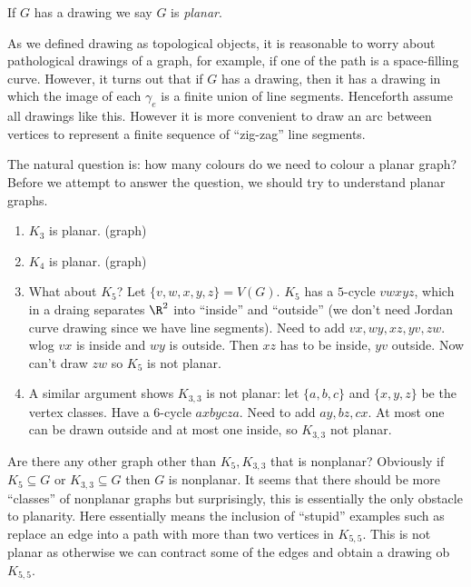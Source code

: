 \documentclass[a4paper]{article}
\begin{document}
\begin{definition}
  If \(G\) has a drawing we say \(G\) is \emph{planar}.
\end{definition}

\begin{remark}
  As we defined drawing as topological objects, it is reasonable to worry about pathological drawings of a graph, for example, if one of the path is a space-filling curve. However, it turns out that if \(G\) has a drawing, then it has a drawing in which the image of each \(\gamma_e\) is a finite union of line segments. Henceforth assume all drawings like this. However it is more convenient to draw an arc between vertices to represent a finite sequence of ``zig-zag'' line segments.
\end{remark}

The natural question is: how many colours do we need to colour a planar graph? Before we attempt to answer the question, we should try to understand planar graphs.

\begin{eg}\leavevmode
  \begin{enumerate}
  \item \(K_3\) is planar. (graph)
  \item \(K_4\) is planar. (graph)
  \item What about \(K_5\)? Let \(\{v, w, x, y, z\} = V(G)\). \(K_5\) has a \(5\)-cycle \(vwxyz\), which in a draing separates \(\R^2\) into ``inside'' and ``outside'' (we don't need Jordan curve drawing since we have line segments). Need to add \(vx, wy, xz, yv, zw\). wlog \(vx\) is inside and \(wy\) is outside. Then \(xz\) has to be inside, \(yv\) outside. Now can't draw \(zw\) so \(K_5\) is not planar.
  \item A similar argument shows \(K_{3, 3}\) is not planar: let \(\{a, b, c\}\) and \(\{x, y, z\}\) be the vertex classes. Have a \(6\)-cycle \(axbycza\). Need to add \(ay, bz, cx\). At most one can be drawn outside and at most one inside, so \(K_{3, 3}\) not planar.
  \end{enumerate}
\end{eg}

Are there any other graph other than \(K_5, K_{3, 3}\) that is nonplanar? Obviously if \(K_5 \subseteq G\) or \(K_{3, 3} \subseteq G\) then \(G\) is nonplanar. It seems that there should be more ``classes'' of nonplanar graphs but surprisingly, this is essentially the only obstacle to planarity. Here essentially means the inclusion of ``stupid'' examples such as replace an edge into a path with more than two vertices in \(K_{5, 5}\). This is not planar as otherwise we can contract some of the edges and obtain a drawing ob \(K_{5, 5}\).
\end{document}
